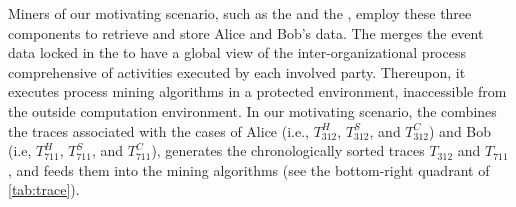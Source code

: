 Miners of our motivating scenario, such as the  and the , employ these three components to retrieve and store Alice and Bob's data. The  merges the event data locked in the  to have a global view of the inter-organizational process comprehensive of activities executed by each involved party. Thereupon, it executes process mining algorithms in a protected environment, inaccessible from the outside computation environment.
In our motivating scenario, the  combines the traces associated with the cases of Alice (i.e., $T^H_{312}$, $T^S_{312}$, and $T^C_{312}$) and Bob (i.e, $T^H_{711}$, $T^S_{711}$, and $T^C_{711}$), generates the chronologically sorted traces $T_{312}$ and $T_{711}$, and feeds them into the mining algorithms (see the bottom-right quadrant of \cref{tab:trace}).

